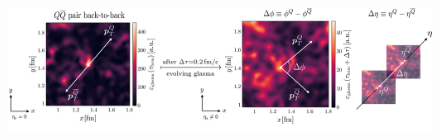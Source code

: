 \documentclass[aspectratio=169,11pt,usenames,dvipsnames]{beamer}
\begin{document}
\begin{frame}
\begin{center}
        \begin{figure}
            \centering
            \includegraphics[width=0.95\columnwidth]{images/sketch_quark_pair_evo_v5.png}
        \end{figure}
    \end{center}
\end{frame}

\end{document}
